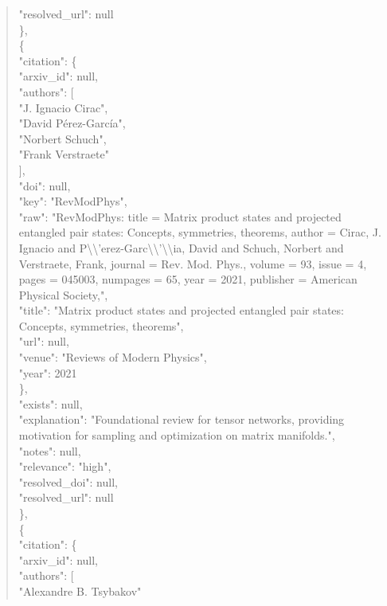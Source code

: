 \documentclass[11pt]{article}
\begin{document}
\begin{quote}
      "resolved\_url": null\\
    \},\\
    \{\\
      "citation": \{\\
        "arxiv\_id": null,\\
        "authors": [\\
          "J. Ignacio Cirac",\\
          "David Pérez-García",\\
          "Norbert Schuch",\\
          "Frank Verstraete"\\
        ],\\
        "doi": null,\\
        "key": "RevModPhys",\\
        "raw": "RevModPhys: title = Matrix product states and projected entangled pair states: Concepts, symmetries, theorems, author = Cirac, J. Ignacio and P\textbackslash{}\textbackslash{}'erez-Garc\textbackslash{}\textbackslash{}'\textbackslash{}\textbackslash{}ia, David and Schuch, Norbert and Verstraete, Frank, journal = Rev. Mod. Phys., volume = 93, issue = 4, pages = 045003, numpages = 65, year = 2021, publisher = American Physical Society,",\\
        "title": "Matrix product states and projected entangled pair states: Concepts, symmetries, theorems",\\
        "url": null,\\
        "venue": "Reviews of Modern Physics",\\
        "year": 2021\\
      \},\\
      "exists": null,\\
      "explanation": "Foundational review for tensor networks, providing motivation for sampling and optimization on matrix manifolds.",\\
      "notes": null,\\
      "relevance": "high",\\
      "resolved\_doi": null,\\
      "resolved\_url": null\\
    \},\\
    \{\\
      "citation": \{\\
        "arxiv\_id": null,\\
        "authors": [\\
          "Alexandre B. Tsybakov"\\

\end{quote}
\end{document}
